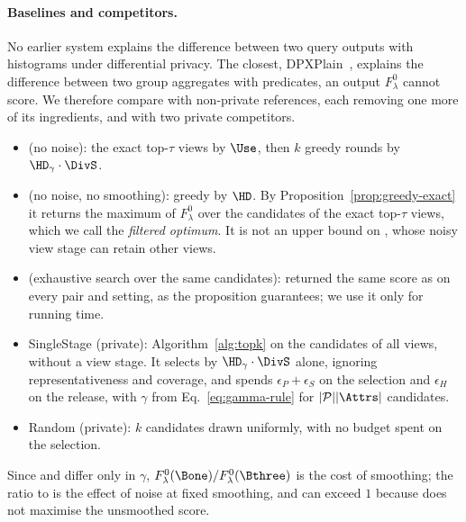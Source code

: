 \paragraph{Baselines and competitors.}
No earlier system explains the difference between two query outputs with histograms under differential privacy.
The closest, DPXPlain~\cite{TaoGMR22}, explains the difference between two group aggregates with predicates, an output $F^0_\lambda$ cannot score.
We therefore compare \sys{} with non-private references, each removing one more of its ingredients, and with two private competitors.
\begin{itemize}[leftmargin=*,itemsep=1pt,topsep=2pt]
  \item \Bone{} (no noise): the exact top-$\tau$ views by $\Use$, then $k$ greedy rounds by $\HD_\gamma\cdot\DivS$.
  \item \Bthree{} (no noise, no smoothing): greedy by $\HD$. By Proposition~\ref{prop:greedy-exact} it returns the maximum of $F^0_\lambda$ over the candidates of the exact top-$\tau$ views, which we call the \emph{filtered optimum}. It is not an upper bound on \sys{}, whose noisy view stage can retain other views.
  \item \Btwo{} (exhaustive search over the same candidates): returned the same score as \Bthree{} on every pair and setting, as the proposition guarantees; we use it only for running time.
  \item \textsf{SingleStage} (private): Algorithm~\ref{alg:topk} on the candidates of all views, without a view stage. It selects by $\HD_\gamma\cdot\DivS$ alone, ignoring representativeness and coverage, and spends $\epsilon_P+\epsilon_S$ on the selection and $\epsilon_H$ on the release, with $\gamma$ from Eq.~\eqref{eq:gamma-rule} for $|\mathcal{P}||\Attrs|$ candidates.
  \item \textsf{Random} (private): $k$ candidates drawn uniformly, with no budget spent on the selection.
\end{itemize}
Since \Bone{} and \Bthree{} differ only in $\gamma$, $F^0_\lambda(\Bone)/F^0_\lambda(\Bthree)$ is the cost of smoothing; the ratio to \Bone{} is the effect of noise at fixed smoothing, and can exceed $1$ because \Bone{} does not maximise the unsmoothed score.

